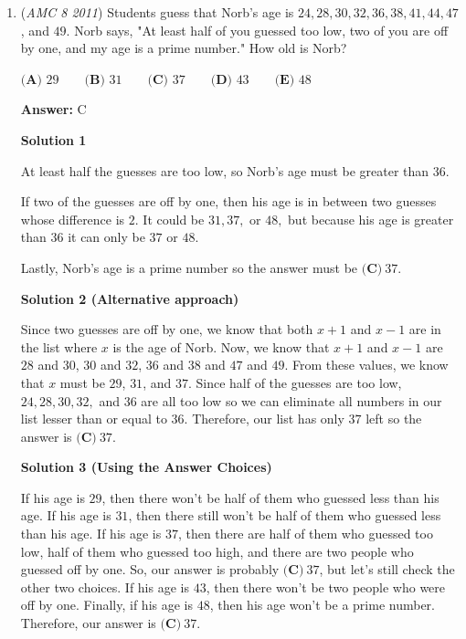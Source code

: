 \begin{enumerate}
 \[b=\sqrt{20^2-12^2}=\sqrt{256}=16\]
$ABYX$ is a rectangle so $XY=AB=50.$

 \[CD=a+XY+b=9+50+16=75\]

 The area of the trapezoid is

 
 \[12\cdot \frac{(50+75)}{2} = 6(125) = \boxed{\textbf{(D)}\ 750}\]



	\item (\textit{AMC 8 2011}) Students guess that Norb's age is $24, 28, 30, 32, 36, 38, 41, 44, 47$, and $49$. Norb says, "At least half of you guessed too low, two of you are off by one, and my age is a prime number." How old is Norb?


 $\textbf{(A) }29\qquad\textbf{(B) }31\qquad\textbf{(C) }37\qquad\textbf{(D) }43\qquad\textbf{(E) }48$

 \textbf{Answer: }C



\textbf{Solution 1}

At least half the guesses are too low, so Norb's age must be greater than $36$.

 If two of the guesses are off by one, then his age is in between two guesses whose difference is $2$. It could be $31,37,$ or $48,$ but because his age is greater than $36$ it can only be $37$ or $48$.

 Lastly, Norb's age is a prime number so the answer must be $\boxed{\textbf{(C)}\ 37}$.

 



\textbf{Solution 2 (Alternative approach)}

Since two guesses are off by one, we know that both $x+1$ and $x-1$ are in the list where $x$ is the age of Norb. Now, we know that $x+1$ and $x-1$ are $28$ and $30$, $30$ and $32$, $36$ and $38$ and $47$ and $49$. From these values, we know that $x$ must be $29$, $31$, and $37$. Since half of the guesses are too low, $24, 28, 30, 32,$ and $36$ are all too low so we can eliminate all numbers in our list lesser than or equal to $36$. Therefore, our list has only $37$ left so the answer is $\boxed{\textbf{(C)}\ 37}$.

 



\textbf{Solution 3 (Using the Answer Choices)}

If his age is $29$, then there won't be half of them who guessed less than his age. If his age is $31$, then there still won't be half of them who guessed less than his age. If his age is $37$, then there are half of them who guessed too low, half of them who guessed too high, and there are two people who guessed off by one. So, our answer is probably $\textbf{(C)}\ 37$, but let's still check the other two choices. If his age is $43$, then there won't be two people who were off by one. Finally, if his age is $48$, then his age won't be a prime number. Therefore, our answer is $\boxed{\textbf{(C)}\ 37}$.


\end{enumerate}
